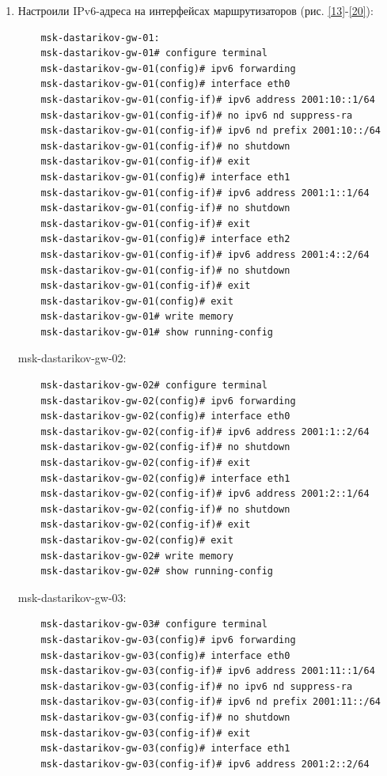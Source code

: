 \begin{enumerate}
\item Настроили IPv6-адреса на интерфейсах маршрутизаторов (рис. \ref{13}-\ref{20}):
\begin{verbatim}
    msk-dastarikov-gw-01:
    msk-dastarikov-gw-01# configure terminal
    msk-dastarikov-gw-01(config)# ipv6 forwarding
    msk-dastarikov-gw-01(config)# interface eth0
    msk-dastarikov-gw-01(config-if)# ipv6 address 2001:10::1/64
    msk-dastarikov-gw-01(config-if)# no ipv6 nd suppress-ra
    msk-dastarikov-gw-01(config-if)# ipv6 nd prefix 2001:10::/64
    msk-dastarikov-gw-01(config-if)# no shutdown
    msk-dastarikov-gw-01(config-if)# exit
    msk-dastarikov-gw-01(config)# interface eth1
    msk-dastarikov-gw-01(config-if)# ipv6 address 2001:1::1/64
    msk-dastarikov-gw-01(config-if)# no shutdown
    msk-dastarikov-gw-01(config-if)# exit
    msk-dastarikov-gw-01(config)# interface eth2
    msk-dastarikov-gw-01(config-if)# ipv6 address 2001:4::2/64
    msk-dastarikov-gw-01(config-if)# no shutdown
    msk-dastarikov-gw-01(config-if)# exit
    msk-dastarikov-gw-01(config)# exit
    msk-dastarikov-gw-01# write memory
    msk-dastarikov-gw-01# show running-config
\end{verbatim}
  msk-dastarikov-gw-02:
\begin{verbatim}
    msk-dastarikov-gw-02# configure terminal
    msk-dastarikov-gw-02(config)# ipv6 forwarding
    msk-dastarikov-gw-02(config)# interface eth0
    msk-dastarikov-gw-02(config-if)# ipv6 address 2001:1::2/64
    msk-dastarikov-gw-02(config-if)# no shutdown
    msk-dastarikov-gw-02(config-if)# exit
    msk-dastarikov-gw-02(config)# interface eth1
    msk-dastarikov-gw-02(config-if)# ipv6 address 2001:2::1/64
    msk-dastarikov-gw-02(config-if)# no shutdown
    msk-dastarikov-gw-02(config-if)# exit
    msk-dastarikov-gw-02(config)# exit
    msk-dastarikov-gw-02# write memory
    msk-dastarikov-gw-02# show running-config
\end{verbatim}
  msk-dastarikov-gw-03:
\begin{verbatim}
    msk-dastarikov-gw-03# configure terminal
    msk-dastarikov-gw-03(config)# ipv6 forwarding
    msk-dastarikov-gw-03(config)# interface eth0
    msk-dastarikov-gw-03(config-if)# ipv6 address 2001:11::1/64
    msk-dastarikov-gw-03(config-if)# no ipv6 nd suppress-ra
    msk-dastarikov-gw-03(config-if)# ipv6 nd prefix 2001:11::/64
    msk-dastarikov-gw-03(config-if)# no shutdown
    msk-dastarikov-gw-03(config-if)# exit
    msk-dastarikov-gw-03(config)# interface eth1
    msk-dastarikov-gw-03(config-if)# ipv6 address 2001:2::2/64

\end{verbatim}
\end{enumerate}
